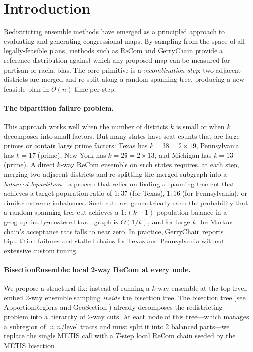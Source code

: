 \section{Introduction}
\label{sec:intro}

Redistricting ensemble methods have emerged as a principled approach to
evaluating and generating congressional maps. By sampling from the space of
all legally-feasible plans, methods such as ReCom \citep{deford2021recombination}
and GerryChain \citep{duchin2019gerrychain} provide a reference distribution
against which any proposed map can be measured for partisan or racial bias.
The core primitive is a \emph{recombination step}: two adjacent districts are
merged and re-split along a random spanning tree, producing a new feasible plan
in $O(n)$ time per step.

\paragraph{The bipartition failure problem.}
This approach works well when the number of districts $k$ is small or when
$k$ decomposes into small factors. But many states have seat counts that are
large primes or contain large prime factors: Texas has $k = 38 = 2 \times 19$,
Pennsylvania has $k = 17$ (prime), New York has $k = 26 = 2 \times 13$,
and Michigan has $k = 13$ (prime). A direct $k$-way ReCom ensemble on such
states requires, at each step, merging two adjacent districts and re-splitting
the merged subgraph into a \emph{balanced bipartition}---a process that relies
on finding a spanning tree cut that achieves a target population ratio of
$1:37$ (for Texas), $1:16$ (for Pennsylvania), or similar extreme imbalances.
Such cuts are geometrically rare: the probability that a random spanning tree
cut achieves a $1:(k-1)$ population balance in a geographically-clustered
tract graph is $O(1/k)$, and for large $k$ the Markov chain's acceptance rate
falls to near zero. In practice, GerryChain reports bipartition failures and
stalled chains for Texas and Pennsylvania without extensive custom tuning.

\paragraph{BisectionEnsemble: local 2-way ReCom at every node.}
We propose a structural fix: instead of running a $k$-way ensemble at the top
level, embed 2-way ensemble sampling \emph{inside} the bisection tree. The
bisection tree (see ApportionRegions \citep{dellaLibera2026apportion} and
GeoSection \citep{dellaLibera2026geosection}) already decomposes the redistricting
problem into a hierarchy of 2-way cuts. At each node of this tree---which
manages a subregion of $\approx n/\text{level}$ tracts and must split it into
2 balanced parts---we replace the single METIS call with a $T$-step local
ReCom chain seeded by the METIS bisection.

